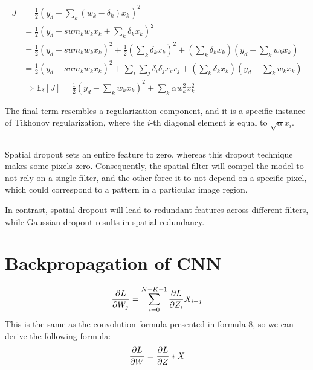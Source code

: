 \documentclass{article}
\newcommand*{\ex}[1]{
    \mathbb{E}_{#1}
}
\begin{document}
\subsection{}
\begin{align*}
    J 
    &= \frac{1}{2}(y_d - \sum_{k}(w_k - \delta_k)x_k)^2 \\
    &= \frac{1}{2}(y_d - sum_{k}w_kx_k + \sum_{k}\delta_kx_k)^2 \\
    &= \frac{1}{2}(y_d - sum_{k}w_kx_k)^2 + \frac{1}{2}(\sum_{k}\delta_kx_k)^2 + (\sum_k\delta_kx_k)(y_d - \sum_{k}w_kx_k) \\
    &= \frac{1}{2}(y_d - sum_{k}w_kx_k)^2 + \sum_{i}\sum_{j}\delta_i\delta_jx_ix_j +  (\sum_k\delta_kx_k)(y_d - \sum_{k}w_kx_k) \\
    &\Rightarrow \ex{\delta}[J] = \frac{1}{2}(y_d - \sum_{k}w_kx_k)^2 + \sum_{k} \alpha w_k^2x_k^2
\end{align*}

The final term resembles a regularization component, and it is a specific instance 
of Tikhonov regularization, where the $i$-th diagonal element is equal 
to $\sqrt{\alpha} x_i$.

\subsection{}
Spatial dropout sets an entire feature to zero, whereas this dropout technique 
makes some pixels zero. Consequently, the spatial filter will compel the model 
to not rely on a single filter, and the other force it to not depend on a specific
 pixel, which could correspond to a pattern in a particular image region.

In contrast, spatial dropout will lead to redundant features across different 
filters, while Gaussian dropout results in spatial redundancy.

\section{Backpropagation of CNN}
\begin{align*}
    \pdv{L}{W_j} = \sum_{i = 0}^{N - K + 1} \pdv{L}{Z_i} X_{i + j}
\end{align*}
This is the same as the convolution formula presented in formula 8, so we can 
derive the following formula:
\begin{align*}
    \pdv{L}{W} = \pdv{L}{Z} * X
\end{align*}
\end{document}
